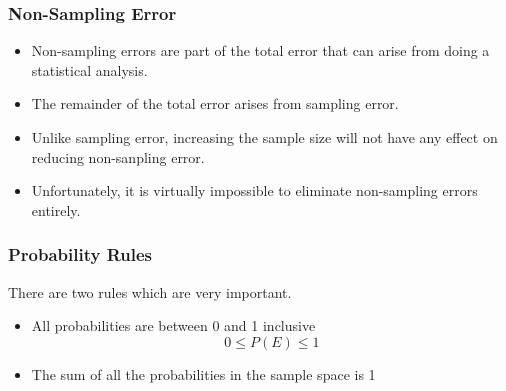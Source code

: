 \documentclass{beamer}
\begin{document}
\begin{frame}
\frametitle{Non-Sampling Error}
\Large
\begin{itemize}
\item 
Non-sampling errors are part of the total error that can arise from doing a statistical analysis. 
\item The remainder of the total error arises from sampling error. 
\item Unlike sampling error, increasing the sample size will not have any effect on reducing non-sanpling error.
\item Unfortunately, it is virtually impossible to eliminate non-sampling errors entirely. 
\end{itemize}
\end{frame}
%
\begin{frame}
\frametitle{Probability Rules}
\Large
\vspace{-1cm}
There are two rules which are very important.
\begin{itemize}
\item All probabilities are between 0 and 1 inclusive
   \[0 \leq P(E) \leq 1\]
\item The sum of all the probabilities in the sample space is 1
\end{itemize}

\end{frame}
\end{document}
